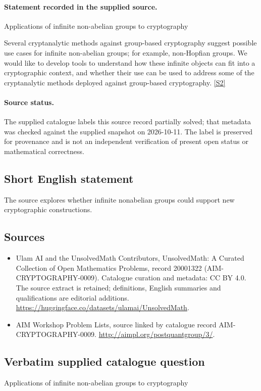 \documentclass[11pt]{article}
\begin{document}
\paragraph{Statement recorded in the supplied source.}
Applications of infinite non-abelian groups to cryptography

Several cryptanalytic methods against group-based cryptography suggest possible use cases for infinite non-abelian groups; for example, non-Hopfian groups. We would like to develop tools to understand how these infinite objects can fit into a cryptographic context, and whether their use can be used to address some of the cryptanalytic methods deployed against group-based cryptography. \href{http://aimpl.org/postquantgroup/3/}{[S2]}
\paragraph{Source status.}
The supplied catalogue labels this source record partially solved; that metadata was checked against the supplied snapshot on 2026-10-11. The label is preserved for provenance and is not an independent verification of present open status or mathematical correctness.
\subsection{Short English statement}
The source explores whether infinite nonabelian groups could support new cryptographic constructions.
\subsection{Sources}
\begin{itemize}
\item[S1] Ulam AI and the UnsolvedMath Contributors, UnsolvedMath: A Curated Collection of Open Mathematics Problems, record 20001322 (AIM-CRYPTOGRAPHY-0009). Catalogue curation and metadata: CC BY 4.0. The source extract is retained; definitions, English summaries and qualifications are editorial additions.
\url{https://huggingface.co/datasets/ulamai/UnsolvedMath}.
\item[S2] AIM Workshop Problem Lists, source linked by catalogue record AIM-CRYPTOGRAPHY-0009.
\url{http://aimpl.org/postquantgroup/3/}.
\end{itemize}
\subsection{Verbatim supplied catalogue question}
Applications of infinite non-abelian groups to cryptography
\end{document}
